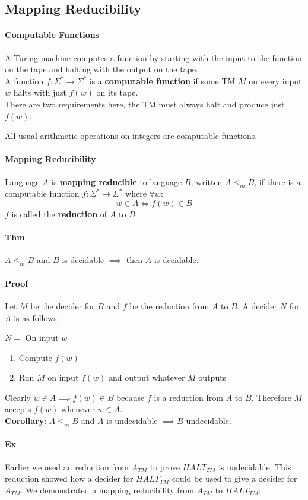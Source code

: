 \documentclass[12 pt]{article}
\begin{document}
\subsection{Mapping Reducibility}
\paragraph{Computable Functions}
A Turing machine computes a function by starting with the input to the
function on the tape and halting with the output on the tape.
\\ A function $f: \Sigma^* \to \Sigma^*$ is a \textbf{computable
  function} if some TM $M$ on every input $w$ halts with just $f(w)$
on its tape.
\\ There are two requirements here, the TM must always halt and
produce just $f(w)$.

All usual arithmetic operations on integers are computable functions.
\paragraph{Mapping Reducibility}
Language $A$ is \textbf{mapping reducible} to language $B$, written $A
\leq_m B$, if there is a computable function $f:\Sigma^* \to \Sigma^*$
where $\forall w$:
$$w \in A \iff f(w) \in B$$
$f$ is called the \textbf{reduction} of $A$ to $B$.
\paragraph{Thm}
$A \leq_m B$ and $B$ is decidable $\implies$ then $A$ is decidable.
\paragraph{Proof} Let $M$ be the decider for $B$ and $f$ be the
reduction from $A$ to $B$. A decider $N$ for $A$ is as follows:

$N = $ On input $w$
\begin{enumerate}
\item Compute $f(w)$
\item Run $M$ on input $f(w)$ and output whatever $M$ outputs
\end{enumerate}
Clearly $w \in A \implies f(w) \in B$ because $f$ is a reduction from
$A$ to $B$. Therefore $M$ accepts $f(w)$ whenever $w \in A$.
\\ \textbf{Corollary}: $A \leq_m B$ and $A$ is undecidable $\implies B$
undecidable.
\paragraph{Ex}
Earlier we used an reduction from $A_{TM}$ to prove $HALT_{TM}$ is
undecidable. This reduction showed how a decider for $HALT_{TM}$ could
be used to give a decider for $A_{TM}$. We demonstrated a mapping
reducibility from $A_{TM}$ to $HALT_{TM}$:
\end{document}
